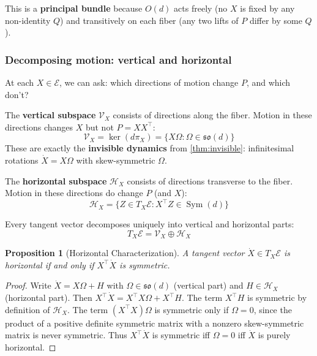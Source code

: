 \documentclass{article}
\newcommand{\so}{\mathfrak{so}}
\DeclareMathOperator{\Sym}{Sym}
\theoremstyle{plain}
\newtheorem{proposition}{Proposition}
\theoremstyle{definition}
\theoremstyle{remark}
\begin{document}
This is a \textbf{principal bundle} because $O(d)$ acts freely (no $X$ is fixed by any non-identity $Q$) and transitively on each fiber (any two lifts of $P$ differ by some $Q$).

\subsubsection{Decomposing motion: vertical and horizontal}

At each $X \in \mathcal{E}$, we can ask: which directions of motion change $P$, and which don't?

The \textbf{vertical subspace} $\mathcal{V}_X$ consists of directions along the fiber. Motion in these directions changes $X$ but not $P = XX^\top$:
\begin{equation}
\mathcal{V}_X = \ker(d\pi_X) = \{X\Omega : \Omega \in \so(d)\}
\end{equation}
These are exactly the \textbf{invisible dynamics} from \cref{thm:invisible}: infinitesimal rotations $\dot{X} = X\Omega$ with skew-symmetric $\Omega$.

The \textbf{horizontal subspace} $\mathcal{H}_X$ consists of directions transverse to the fiber. Motion in these directions do change $P$ (and $X$):
\begin{equation}
\mathcal{H}_X = \{Z \in T_X \mathcal{E} : X^\top Z \in \Sym(d)\}
\end{equation}

Every tangent vector decomposes uniquely into vertical and horizontal parts:
\begin{equation}
T_X \mathcal{E} = \mathcal{V}_X \oplus \mathcal{H}_X
\end{equation}

\begin{proposition}[Horizontal Characterization]\label{prop:horizontal}
A tangent vector $\dot{X} \in T_X \mathcal{E}$ is horizontal if and only if $X^\top \dot{X}$ is symmetric.
\end{proposition}

\begin{proof}
Write $\dot{X} = X\Omega + H$ with $\Omega \in \so(d)$ (vertical part) and $H \in \mathcal{H}_X$ (horizontal part).
Then $X^\top \dot{X} = X^\top X \Omega + X^\top H$.
The term $X^\top H$ is symmetric by definition of $\mathcal{H}_X$.
The term $(X^\top X) \Omega$ is symmetric only if $\Omega = 0$, since the product of a positive definite symmetric matrix with a nonzero skew-symmetric matrix is never symmetric.
Thus $X^\top \dot{X}$ is symmetric iff $\Omega = 0$ iff $\dot{X}$ is purely horizontal.
\end{proof}
\end{document}

